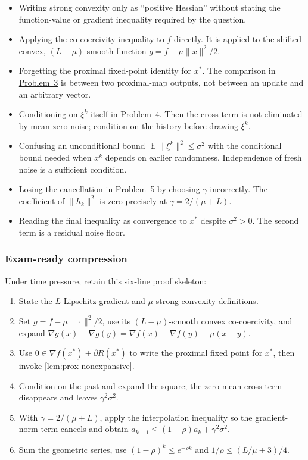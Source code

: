 \documentclass[11pt,a4paper]{article}
\DeclareMathOperator{\E}{\mathbb{E}}
\newcommand{\jump}[2]{\hyperref[#1]{#2}}
\theoremstyle{definition}
\begin{document}
\begin{itemize}
  \item Writing strong convexity only as ``positive Hessian'' without stating the function-value or gradient inequality required by the question.
  \item Applying the co-coercivity inequality to $f$ directly. It is applied to the shifted convex, $(L-\mu)$-smooth function $g=f-\mu\|x\|^2/2$.
  \item Forgetting the proximal fixed-point identity for $x^*$. The comparison in \jump{prob:spr2025-opt-3}{Problem~3} is between two proximal-map outputs, not between an update and an arbitrary vector.
  \item Conditioning on $\xi^k$ itself in \jump{prob:spr2025-opt-4}{Problem~4}. Then the cross term is not eliminated by mean-zero noise; condition on the history before drawing $\xi^k$.
  \item Confusing an unconditional bound $\E\|\xi^k\|^2\leq\sigma^2$ with the conditional bound needed when $x^k$ depends on earlier randomness. Independence of fresh noise is a sufficient condition.
  \item Losing the cancellation in \jump{prob:spr2025-opt-5}{Problem~5} by choosing $\gamma$ incorrectly. The coefficient of $\|h_k\|^2$ is zero precisely at $\gamma=2/(\mu+L)$.
  \item Reading the final inequality as convergence to $x^*$ despite $\sigma^2>0$. The second term is a residual noise floor.
\end{itemize}

\subsubsection{Exam-ready compression}

Under time pressure, retain this six-line proof skeleton:

\begin{enumerate}
  \item State the $L$-Lipschitz-gradient and $\mu$-strong-convexity definitions.
  \item Set $g=f-\mu\|\cdot\|^2/2$, use its $(L-\mu)$-smooth convex co-coercivity, and expand $\nabla g(x)-\nabla g(y)=\nabla f(x)-\nabla f(y)-\mu(x-y)$.
  \item Use $0\in\nabla f(x^*)+\partial R(x^*)$ to write the proximal fixed point for $x^*$, then invoke \cref{lem:prox-nonexpansive}.
  \item Condition on the past and expand the square; the zero-mean cross term disappears and leaves $\gamma^2\sigma^2$.
  \item With $\gamma=2/(\mu+L)$, apply the interpolation inequality so the gradient-norm term cancels and obtain $a_{k+1}\leq(1-\rho)a_k+\gamma^2\sigma^2$.
  \item Sum the geometric series, use $(1-\rho)^k\leq e^{-\rho k}$ and $1/\rho\leq(L/\mu+3)/4$.
\end{enumerate}
\end{document}
